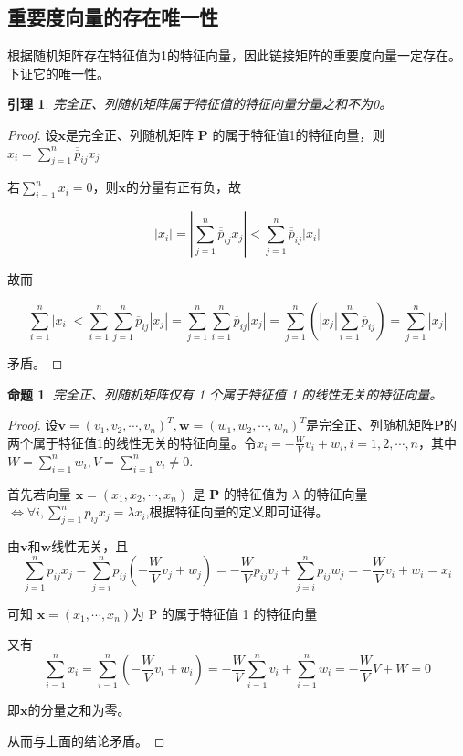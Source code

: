 \documentclass[10t, a4paper, oneside]{ctexbook}
\newtheorem{lemma}[theorem]{引理}
\newtheorem{proposition}[theorem]{命题}
\begin{document}
\subsection{重要度向量的存在唯一性}
根据随机矩阵存在特征值为1的特征向量，因此链接矩阵的重要度向量一定存在。下证它的唯一性。
\begin{lemma}
    完全正、列随机矩阵属于特征值的特征向量分量之和不为0。
\end{lemma}
\begin{proof}
    设$\mathbf{x}$是完全正、列随机矩阵 $\mathbf{P}$ 的属于特征值1的特征向量，则$x_i=\sum\limits_{j=1}^n\overline{\overline{p}}_{ij}x_j$
        
        若$\sum\limits_{i=1}^nx_i=0$，则$\mathbf{x}$的分量有正有负，故
        
        $$|x_i|=|\sum\limits_{j=1}^n\overline{\overline{p}}_{ij}x_j|<\sum\limits_{j=1}^n\overline{\overline{p}}_{ij}|x_i|$$

        故而

        $$\sum\limits_{i=1}^n|x_i|<\sum\limits_{i=1}^n\sum\limits_{j=1}^n\overline{\overline{p}}_{ij}|x_j|=\sum\limits_{j=1}^n\sum\limits_{i=1}^n\overline{\overline{p}}_{ij}|x_j|=\sum\limits_{j=1}^n(|x_j|\sum\limits_{i=1}^n\overline{\overline{p}}_{ij})=\sum\limits_{j=1}^n|x_j|$$

        矛盾。
\end{proof}
\begin{proposition}
    完全正、列随机矩阵仅有 1 个属于特征值 1 的线性无关的特征向量。
\end{proposition}
\begin{proof}
    
    设$\mathbf{v}=(v_1,v_2,\cdots,v_n)^T, \mathbf{w}=(w_1,w_2,\cdots,w_n)^T$是完全正、列随机矩阵$\mathbf{P}$的两个属于特征值1的线性无关的特征向量。令$x_i = -\frac{W}{V}v_i+w_i, i = 1,2,\cdots,n$，其中$W=\sum_{i=1}^nw_i, V=\sum_{i=1}^nv_i\neq 0$.
    
    首先若向量 $\mathbf{x} = (x_1,x_2,\cdots,x_n)$ 是 $\mathbf{P}$ 的特征值为 $\lambda$ 的特征向量 $\Leftrightarrow \forall i, \sum\limits_{j=1}^n p_{ij}x_j=\lambda x_i$,根据特征向量的定义即可证得。

    由$\mathbf{v}$和$\mathbf{w}$线性无关，且
    $$\sum\limits_{j=1}^n p_{ij}x_j=\sum\limits_{j=i}^n p_{ij}(-\frac{W}{V}v_j+w_j)=-\frac{W}{V} p_{ij}v_j+\sum\limits_{j=i}^n p_{ij}w_j=-\frac{W}{V}v_i+w_i=x_i$$

    可知 $\mathbf{x}=(x_1,\cdots,x_n)$为 P 的属于特征值 1 的特征向量
   
    又有
    $$\sum\limits_{i=1}^nx_i = \sum\limits_{i=1}^n(-\frac{W}{V}v_i+w_i) = -\frac{W}{V}\sum\limits_{i=1}^nv_i+\sum\limits_{i=1}^nw_i = -\frac{W}{V}V+W = 0$$

    即$\mathbf{x}$的分量之和为零。

    从而与上面的结论矛盾。
\end{proof}
\end{document}
